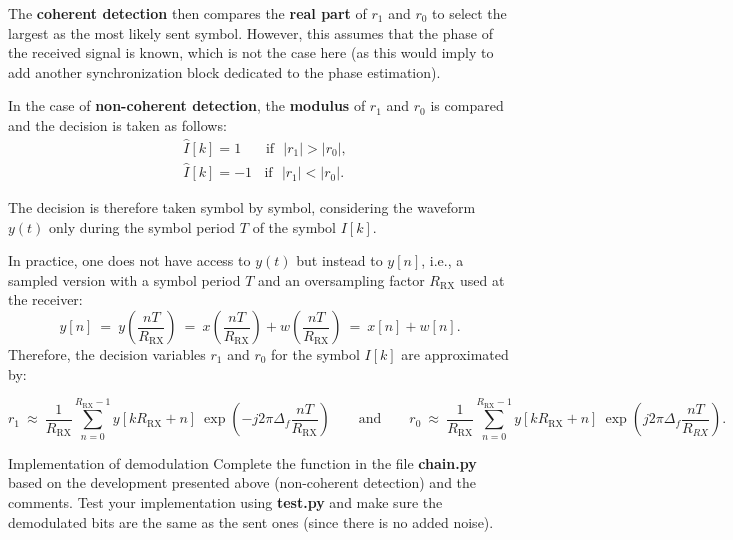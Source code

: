 The \textbf{coherent detection} then compares the \textbf{real part} of $r_1$ and $r_0$ to select the largest as the most likely sent symbol. However, this assumes that the phase of the received signal is known, which is not the case here (as this would imply to add another synchronization block dedicated to the phase estimation).

In the case of \textbf{non-coherent detection}, the \textbf{modulus} of $r_1$ and $r_0$ is compared and the decision is taken as follows:
\begin{align*}
    &\hat{I}[k]=1 \: \:\:\:\:\:\:\:\text{if}\:\:\: |r_1| > |r_0|,\\
    &\hat{I}[k]=-1 \:\: \:\:\text{if}\:\:\: |r_1| < |r_0|.
\end{align*}

The decision is therefore taken symbol by symbol, considering the waveform $y(t)$ only during the symbol period $T$ of the symbol $I[k]$.

In practice, one does not have access to $y(t)$ but instead to $y[n]$, i.e., a sampled version with a symbol period $T$ and an oversampling factor $R_{\text{RX}}$ used at the receiver:
\begin{equation*}
    y[n]\:=\:y\left(\frac{nT}{R_{\text{RX}}}\right)\:=\:x\left(\frac{nT}{R_{\text{RX}}}\right)+w\left(\frac{nT}{R_{\text{RX}}}\right)\:=\: x[n] + w[n].
\end{equation*}
Therefore, the decision variables $r_1$ and $r_0$ for the symbol $I[k]$ are approximated by:
\begin{small}
\begin{equation*}
    r_1\:\approx\:\frac{1}{R_{\text{RX}}}\sum_{n=0}^{R_{\text{RX}}-1} y[kR_{\text{RX}}+n] \:\exp \left(-j2\pi \Delta_f \frac{nT}{R_{\text{RX}}}\right)\qquad \text{and} \qquad r_0\:\approx\:\frac{1}{R_{\text{RX}}}\sum_{n=0}^{R_{\text{RX}}-1} y[kR_{\text{RX}}+n] \:\exp \left(j2\pi \Delta_f \frac{nT}{R_{RX}}\right).
\end{equation*}
\end{small}

\begin{bclogo}[couleur = gray!20, arrondi = 0.2, logo=\bccrayon]{Implementation of demodulation}
Complete the  function in the file \textbf{chain.py} based on the development presented above (non-coherent detection) and the comments. Test your implementation using \textbf{test.py} and make sure the demodulated bits are the same as the sent ones (since there is no added noise).
\end{bclogo}

